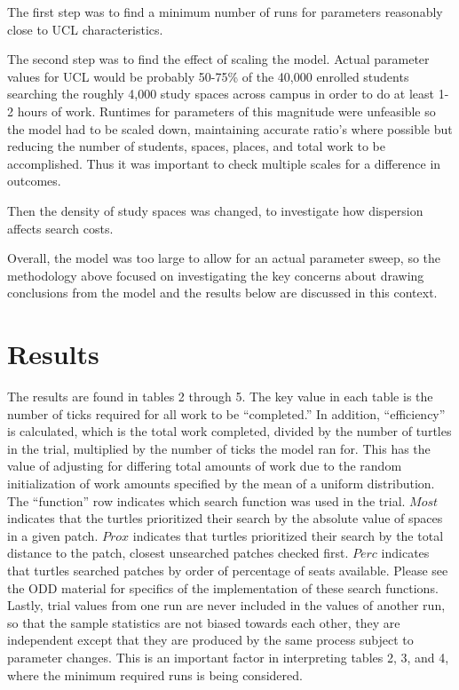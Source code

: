 \documentclass[11pt]{article} %
\begin{document}
The first step was to find a minimum number of runs for parameters reasonably close to UCL characteristics. 

The second step was to find the effect of scaling the model. Actual parameter values for UCL would be probably 50-75\% of the 40,000 enrolled students searching the roughly 4,000 study spaces across campus in order to do at least 1-2 hours of work. Runtimes for parameters of this magnitude were unfeasible so the model had to be scaled down, maintaining accurate ratio's where possible but reducing the number of students, spaces, places, and total work to be accomplished. Thus it was important to check multiple scales for a difference in outcomes. 

Then the density of study spaces was changed, to investigate how dispersion affects search costs.

Overall, the model was too large to allow for an actual parameter sweep, so the methodology above focused on investigating the key concerns about drawing conclusions from the model and the results below are discussed in this context. 


\section{Results}

The results are found in tables 2 through 5. The key value in each table is the number of ticks required for all work to be ``completed.'' In addition, ``efficiency'' is calculated, which is the total work completed, divided by the number of turtles in the trial, multiplied by the number of ticks the model ran for. This has the value of adjusting for differing total amounts of work due to the random initialization of work amounts specified by the mean of a uniform distribution. The ``function'' row indicates which search function was used in the trial. $Most$ indicates that the turtles prioritized their search by the absolute value of spaces in a given patch. $Prox$ indicates that turtles prioritized their search by the total distance to the patch, closest unsearched patches checked first. $Perc$ indicates that turtles searched patches by order of percentage of seats available. Please see the ODD material for specifics of the implementation of these search functions. Lastly, trial values from one run are never included in the values of another run, so that the sample statistics are not biased towards each other, they are independent except that they are produced by the same process subject to parameter changes. This is an important factor in interpreting tables 2, 3, and 4, where the minimum required runs is being considered. 
\end{document}
